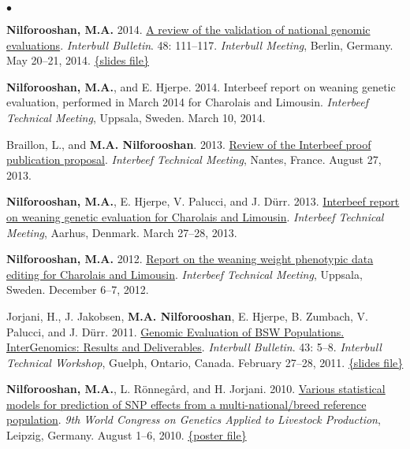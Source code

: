 \documentclass[margin,line]{res}
\newenvironment{list2}{
  \begin{list}{$\bullet$}{%
      \setlength{\itemsep}{0in}
      \setlength{\parsep}{0in} \setlength{\parskip}{0in}
      \setlength{\topsep}{0in} \setlength{\partopsep}{0in}
      \setlength{\leftmargin}{0.2in}}}{\end{list}}
\begin{document}
\begin{resume}
\begin{list2}
\item {\bf Nilforooshan, M.A.} 2014. \href{https://www.researchgate.net/publication/358198989_A_Review_of_the_Validation_of_National_Genomic_Evaluations}{A review of the validation of national genomic evaluations}. {\em Interbull Bulletin}. 48: 111--117. {\em Interbull Meeting}, Berlin, Germany. May 20--21, 2014. \href{https://drive.google.com/file/d/0B2l_izQwJmVpdmxrUjF5WGc1X3c/view?usp=sharing&resourcekey=0-OBCPGDhhf3PpkbQL_lwMXg}{\{slides file\}}
\item {\bf Nilforooshan, M.A.}, and E. Hjerpe. 2014. Interbeef report on weaning genetic evaluation, performed in March 2014 for Charolais and Limousin. {\em Interbeef Technical Meeting}, Uppsala, Sweden. March 10, 2014.
\item Braillon, L., and {\bf M.A. Nilforooshan}. 2013. \href{https://drive.google.com/file/d/0B2l_izQwJmVpYWE2VndwNGhJblU/view?usp=sharing&resourcekey=0-lK2OKh6je4O4Dz_z0I9jJg}{Review of the Interbeef proof publication proposal}. {\em Interbeef Technical Meeting}, Nantes, France. August 27, 2013.
\item {\bf Nilforooshan, M.A.}, E. Hjerpe, V. Palucci, and J. D\"{u}rr. 2013. \href{https://drive.google.com/file/d/0B2l_izQwJmVpZ2RRcXc0bS11RmM/view?usp=sharing&resourcekey=0-mJU9o7o9WqG3XXCrFYq9Xw}{Interbeef report on weaning genetic evaluation for Charolais and Limousin}. {\em Interbeef Technical Meeting}, Aarhus, Denmark. March 27--28, 2013.
\item {\bf Nilforooshan, M.A.} 2012. \href{https://drive.google.com/file/d/0B2l_izQwJmVpLVY5NU1UZGR6czA/view?usp=sharing&resourcekey=0-z2Uuf8hnh-P_CXmZJ6iNXw}{Report on the weaning weight phenotypic data editing for Charolais and Limousin}. {\em Interbeef Technical Meeting}, Uppsala, Sweden. December 6--7, 2012.
\item Jorjani, H., J. Jakobsen, {\bf M.A. Nilforooshan}, E. Hjerpe, B. Zumbach, V. Palucci, and J. D\"{u}rr. 2011. \href{https://www.researchgate.net/publication/265218200_Genomic_Evaluation_of_BSW_Populations_InterGenomics_Results_and_Deliverables}{Genomic Evaluation of BSW Populations. InterGenomics: Results and Deliverables}. {\em Interbull Bulletin}. 43: 5--8. {\em Interbull Technical Workshop}, Guelph, Ontario, Canada. February 27--28, 2011. \href{https://drive.google.com/file/d/0B2l_izQwJmVpbGh3ZC1iRWhCWVE/view?usp=sharing&resourcekey=0-BFevbAqrR4lVT5anezUffQ}{\{slides file\}}
\item {\bf Nilforooshan, M.A.}, L. R\"{o}nneg\r{a}rd, and H. Jorjani. 2010. \href{https://www.researchgate.net/publication/267973054_Various_Statistical_Models_For_Prediction_Of_SNP_Effects_From_A_Multi-NationalBreed_Reference_Population}{Various statistical models for prediction of SNP effects from a multi-national/breed reference population}. {\em 9th World Congress on Genetics Applied to Livestock Production}, Leipzig, Germany. August 1--6, 2010. \href{https://doi.org/10.13140/RG.2.2.36673.22881}{\{poster file\}}

\end{list2}
\end{resume}
\end{document}
